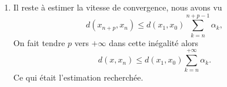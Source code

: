 {{\begin{enumerate}
Pour tout $n\in \Nn$ nous avons
$$x_{n+1}=f(x_n).$$
\`A la limite, la suite $(x_{n+1})$ tend vers $x$, et comme $f$ est continue
(elle est $\alpha_1$-lipschitziènne : $d(f(x),f(y)) \le \alpha_1 d(x,y)$) alors
$(f(x_n))$  converge vers $f(x)$. Par unicité de la limite nous obtenons
$$x=f(x).$$
Donc $f$ possède un point fixe, qui est unique et est obtenu en partant d'un point quelconque $x_0\in X$ comme limite de $(f^n(x_0))_n$.

  \item Il reste à estimer la vitesse de convergence, nous avons vu
$$ d(x_{n+p},x_n) \le d(x_{1},x_{0})\sum_{k=n}^{n+p-1} \alpha_k,$$
On fait tendre $p$ vers $+\infty$ dans cette inégalité alors
$$ d(x,x_n) \le d(x_{1},x_{0})\sum_{k=n}^{+\infty} \alpha_k.$$
Ce qui était l'estimation recherchée.
\end{enumerate}}
}